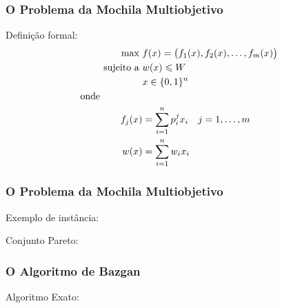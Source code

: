 \documentclass[10pt,xcolor=table,fleqn]{beamer}
\begin{document}
\begin{frame}
  \frametitle{O Problema da Mochila Multiobjetivo}
  \begin{block}{Definição formal:}
    \begin{align*}
      \text{max   } & f(x) =
        \big(f_1(x) ,f_2(x) ,\ldots ,f_{m}(x)\big) \\
      \text{sujeito a   } & w(x) \leqslant W \\
      & x \in \{0, 1\}^n\\
      \text{onde} \phantom{mmmmm} \\
      f_j(x) &= \sum_{i = 1}^n p^j_i x_i \quad j = 1, \ldots, m\\
      w(x) &= \sum_{i = 1}^n w_i x_i
    \end{align*}
  \end{block}
\end{frame}

\begin{frame}
	\frametitle{O Problema da Mochila Multiobjetivo}
  Exemplo de instância:
  \begin{table}[ht]
    
  \end{table}
  \pause
  Conjunto Pareto:
  \begin{table}[ht]
    
  \end{table}
\end{frame}

\begin{frame}
	\frametitle{O Algoritmo de Bazgan}
  \begin{block}{Algoritmo Exato:}
  \end{block}
  \begin{algorithm}[H]
    \footnotesize
    
    \caption{O algoritmo de Nemhauser e Ullmann para o \mokp.}
  \end{algorithm}
\end{frame}
\end{document}
